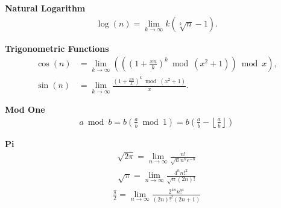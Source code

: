 \documentclass[10pt,a4paper]{article}
\theoremstyle{plain}
\newcommand{\floor}[1]{\left\lfloor #1 \right\rfloor}
\begin{document}
\textbf{Natural Logarithm}
\begin{align*}
\log(n) = \lim_{k\rightarrow\infty} k (\sqrt[k]{n}-1) .
\end{align*}

\textbf{Trigonometric Functions}
\begin{align*}
\cos(n) &= \lim_{k\to\infty} \left( \left( \left( 1+\frac{xn}{k} \right)^k \bmod (x^2+1) \right) \bmod x \right) , \\
\sin(n) &= \lim_{k\to\infty} \frac{\left( 1+\frac{xn}{k} \right)^k \bmod (x^2+1)}{x} .
\end{align*}

\textbf{Mod One}
\begin{align*}
a \bmod b
= b \left( \frac{a}{b} \bmod 1 \right)
= b \left( \frac{a}{b} - \floor{\frac{a}{b}} \right)
\end{align*}

\textbf{Pi}
\begin{align*}
\sqrt{2\pi} = \lim_{n\rightarrow\infty} \frac{n!}{\sqrt{n}n^n e^{-n}}
\end{align*}
\begin{align*}
\sqrt{\pi} = \lim_{n\rightarrow\infty} \frac{4^n n!^2}{\sqrt{n} (2n)!}
\end{align*}
\begin{align*}
\frac{\pi}{2}
= \lim_{n\rightarrow\infty} \frac{2^{4n} n!^4}{(2n)!^2 (2n+1)}
\end{align*}

\footnotesize

\begingroup
\raggedright


\endgroup
\end{document}
